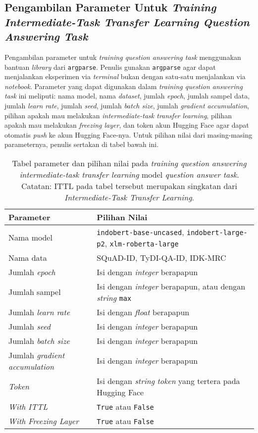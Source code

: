 \subsection{Pengambilan Parameter Untuk \emph{Training Intermediate-Task Transfer Learning Question Answering Task}}
Pengambilan parameter untuk \emph{training question answering task} menggunakan bantuan \emph{library} dari \texttt{argparse}. Penulis gunakan \texttt{argparse} agar dapat menjalankan eksperimen via \emph{terminal} bukan dengan satu-satu menjalankan via \emph{notebook}. Parameter yang dapat digunakan dalam \emph{training question answering task} ini meliputi: nama model, nama \emph{dataset}, jumlah \emph{epoch}, jumlah sampel data, jumlah \emph{learn rate}, jumlah \emph{seed}, jumlah \emph{batch size}, jumlah \emph{gradient accumulation}, pilihan apakah mau melakukan \emph{intermediate-task transfer learning}, pilihan apakah mau melakukan \emph{freezing layer}, dan token akun Hugging Face agar dapat otomatis \emph{push} ke akun Hugging Face-nya. Untuk pilihan nilai dari masing-masing parameternya, penulis sertakan di tabel bawah ini.

\begin{table}[h!]
\centering
\begin{tabular}{|P{2.0in}|P{4.0in}|}
 \hline
 Parameter & Pilihan Nilai \\ [0.5ex] 
 \hline
 Nama model & \texttt{indobert-base-uncased}, \texttt{indobert-large-p2}, \texttt{xlm-roberta-large} \\ 
 Nama data & SQuAD-ID, TyDI-QA-ID, IDK-MRC \\
 Jumlah \emph{epoch} & Isi dengan \emph{integer} berapapun \\
 Jumlah sampel & Isi dengan \emph{integer} berapapun, atau dengan \emph{string} \texttt{max} \\
 Jumlah \emph{learn rate} & Isi dengan \emph{float} berapapun \\ 
 Jumlah \emph{seed} & Isi dengan \emph{integer} berapapun \\ 
 Jumlah \emph{batch size} & Isi dengan \emph{integer} berapapun \\ 
 Jumlah \emph{gradient accumulation} & Isi dengan \emph{integer} berapapun \\ 
 \emph{Token} & Isi dengan \emph{string} \emph{token} yang tertera pada Hugging Face \\
 \emph{With ITTL} & \texttt{True} atau \texttt{False} \\
 \emph{With Freezing Layer} & \texttt{True} atau \texttt{False} \\ [1ex] 
 \hline
\end{tabular}
\caption{Tabel parameter dan pilihan nilai pada \emph{training question answering} \emph{intermediate-task transfer learning} model \emph{question answer task}. Catatan: ITTL pada tabel tersebut merupakan singkatan dari \emph{Intermediate-Task Transfer Learning}.}
\end{table}

